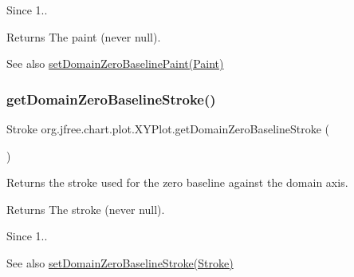 \begin{DoxySince}{Since}
1..
\end{DoxySince}
\begin{DoxyReturn}{Returns}
The paint (never {\ttfamily null}).
\end{DoxyReturn}
\begin{DoxySeeAlso}{See also}
\mbox{\hyperlink{classorg_1_1jfree_1_1chart_1_1plot_1_1_x_y_plot_a9edcbc7a87e2dcd4a7972a5218bd4ea3}{set\+Domain\+Zero\+Baseline\+Paint(\+Paint)}} 
\end{DoxySeeAlso}
\mbox{\label{classorg_1_1jfree_1_1chart_1_1plot_1_1_x_y_plot_ab83221c2254542e462bbff89d09e66e9}} 
\subsubsection{\texorpdfstring{get\+Domain\+Zero\+Baseline\+Stroke()}{getDomainZeroBaselineStroke()}}
{\footnotesize\ttfamily Stroke org.\+jfree.\+chart.\+plot.\+X\+Y\+Plot.\+get\+Domain\+Zero\+Baseline\+Stroke (\begin{DoxyParamCaption}{ }\end{DoxyParamCaption})}

Returns the stroke used for the zero baseline against the domain axis.

\begin{DoxyReturn}{Returns}
The stroke (never {\ttfamily null}).
\end{DoxyReturn}
\begin{DoxySince}{Since}
1..
\end{DoxySince}
\begin{DoxySeeAlso}{See also}
\mbox{\hyperlink{classorg_1_1jfree_1_1chart_1_1plot_1_1_x_y_plot_ad1aceb453eac28dec65962270a491361}{set\+Domain\+Zero\+Baseline\+Stroke(\+Stroke)}} 
\end{DoxySeeAlso}
\mbox{\label{classorg_1_1jfree_1_1chart_1_1plot_1_1_x_y_plot_addf279078b32787b75a4562fb61734be}} 
